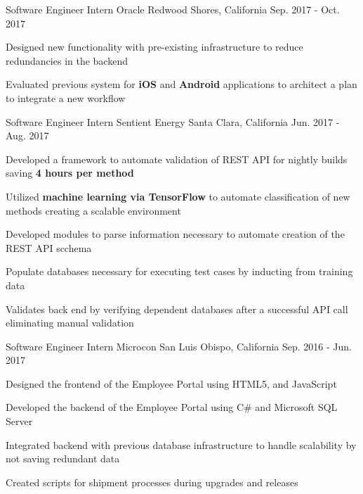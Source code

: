 \begin{cventries}
\cventry
{Software Engineer Intern}
{Oracle}
{Redwood Shores, California}
{Sep. 2017 - Oct. 2017}
{
\begin{cvitems}
\item {Designed new functionality with pre-existing infrastructure to reduce redundancies in the backend}
\item {Evaluated previous system for \textbf{iOS} and \textbf{Android} applications to architect a plan to integrate a new workflow}
\end{cvitems}
}

\cventry
{Software Engineer Intern} %
{Sentient Energy} %
{Santa Clara, California} %
{Jun. 2017 - Aug. 2017} %
{ %
\begin{cvitems}
\item {Developed a framework to automate validation of REST API for nightly builds saving \textbf{4 hours per method}}
\item {Utilized \textbf{machine learning via TensorFlow} to automate classification of new methods creating a scalable environment}
\item {Developed modules to parse information necessary to automate creation of the REST API scchema}
\item {Populate databases necessary for executing test cases by inducting from training data}
\item {Validates back end by verifying dependent databases after a successful API call eliminating manual validation}
\end{cvitems}
}


\cventry
{Software Engineer Intern} %
{Microcon} %
{San Luis Obispo, California} %
{Sep. 2016 - Jun. 2017} %
{ %
\begin{cvitems}
\item {Designed the frontend of the Employee Portal using HTML5, and JavaScript}
\item {Developed the backend of the Employee Portal using C\# and Microsoft SQL Server}
\item {Integrated backend with previous database infrastructure to handle scalability by not saving redundant data}
\item {Created scripts for shipment processes during upgrades and releases}
\end{cvitems}
}


\end{cventries}
